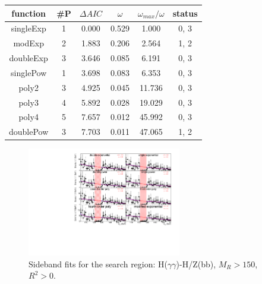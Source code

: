 \begin{table}[h] 
\begin{center} 
\begin{tabular}{|c|c|ccc|c|} 
\hline function & \#P & $\Delta AIC$ & $\omega$ & $\omega_{max}/\omega$ & status \\ \hline 
\rowcolor[rgb]{0.31,0.78,0.47}  
singleExp &  1 &  0.000 &  0.529 &  1.000 &  0,  3 \\ 
\rowcolor[rgb]{0.31,0.78,0.47}  
modExp &  2 &  1.883 &  0.206 &  2.564 &  1,  2 \\ 
\rowcolor[rgb]{1.0,0.41,0.38}  
doubleExp &  3 &  3.646 &  0.085 &  6.191 &  0,  3 \\ 
\rowcolor[rgb]{1.0,0.41,0.38}  
singlePow &  1 &  3.698 &  0.083 &  6.353 &  0,  3 \\ 
\rowcolor[rgb]{1.0,0.41,0.38}  
poly2 &  3 &  4.925 &  0.045 & 11.736 &  0,  3 \\ 
\rowcolor[rgb]{1.0,0.41,0.38}  
poly3 &  4 &  5.892 &  0.028 & 19.029 &  0,  3 \\ 
\rowcolor[rgb]{1.0,0.41,0.38}  
poly4 &  5 &  7.657 &  0.012 & 45.992 &  0,  3 \\ 
\rowcolor[rgb]{1.0,0.41,0.38}  
doublePow &  3 &  7.703 &  0.011 & 47.065 &  1,  2 \\ 
\hline 
\end{tabular} 
\label{tab:AICresults3} 
\end{center} 
\end{table} 

\begin{figure}[h] 
\begin{center} 
\includegraphics[width=0.6\textwidth]{hgg/hzbb/150_0d00.pdf} 
\caption{Sideband fits for the search region:
  H($\gamma\gamma$)-H/Z(bb), $M_R > 150$\GeV , $R^2 > 0$.} 
\label{fig:AICresults4} 
\end{center} 
\end{figure} 

